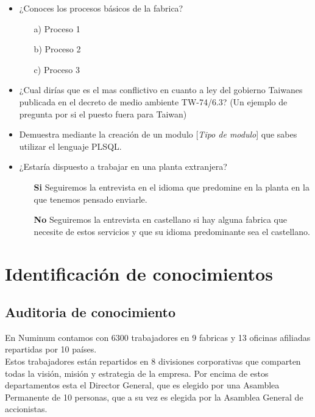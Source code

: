 \documentclass[a4paper]{article}
\begin{document}
\begin{itemize}
	\item ¿Conoces los procesos básicos de la fabrica?
	\begin{itemize}
		\item[a)] Proceso 1
		\item[b)] Proceso 2
		\item[c)] Proceso 3
	\end{itemize}
	
	\item ¿Cual dirías que es el mas conflictivo en cuanto a ley del gobierno Taiwanes publicada en el decreto de medio ambiente TW-74/6.3? (Un ejemplo de pregunta por si el puesto fuera para Taiwan)
	\item Demuestra mediante la creación de un modulo  [\textit{Tipo de modulo}] que sabes utilizar el lenguaje PLSQL.
	\item ¿Estaría dispuesto a trabajar en una planta extranjera?
	\begin{itemize}
		\item[\textbf{Si}] Seguiremos la entrevista en el idioma que predomine en la planta en la que tenemos pensado enviarle.
		\item[\textbf{No}] Seguiremos la entrevista en castellano si hay alguna fabrica que necesite de estos servicios y que su idioma predominante sea el castellano.
	\end{itemize}
\end{itemize}



\section{Identificación de conocimientos}

\subsection{Auditoria de conocimiento}

En Numinum contamos con 6300 trabajadores en 9 fabricas y 13 oficinas afiliadas repartidas por 10 países.\\
Estos trabajadores están repartidos en 8 divisiones corporativas que comparten todas la visión, misión y estrategia de la empresa.
Por encima de estos departamentos esta el Director General, que es elegido por una Asamblea Permanente de 10 personas, que a su vez es elegida por la Asamblea General de accionistas.
\end{document}
